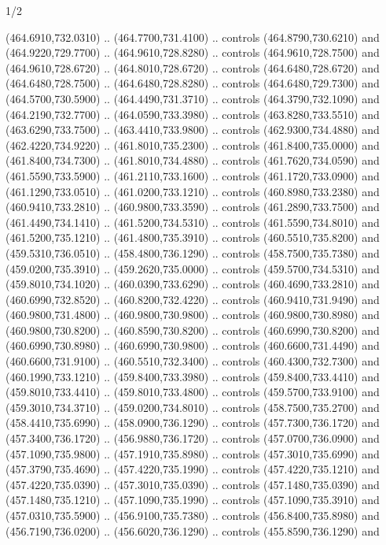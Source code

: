 \begin{flagdescription}{1/2}
\begin{scope}[xshift=0.5\flaglength]
\begin{scope}[scale=0.00745\flagwidth,xshift=-12.1mm,yshift=41.7mm]
\begin{scope}[y=0.80pt, x=0.80pt, yscale=-1, xscale=1, inner sep=0pt, outer sep=0pt]
\begin{scope}[cm={{1.33333,0.0,0.0,-1.33333,(0.0,114.66667)}}]
\begin{scope}[scale=0.100]
  (464.6910,732.0310) .. (464.7700,731.4100) .. controls (464.8790,730.6210) and
  (464.9220,729.7700) .. (464.9610,728.8280) .. controls (464.9610,728.7500) and
  (464.9610,728.6720) .. (464.8010,728.6720) .. controls (464.6480,728.6720) and
  (464.6480,728.7500) .. (464.6480,728.8280) .. controls (464.6480,729.7300) and
  (464.5700,730.5900) .. (464.4490,731.3710) .. controls (464.3790,732.1090) and
  (464.2190,732.7700) .. (464.0590,733.3980) .. controls (463.8280,733.5510) and
  (463.6290,733.7500) .. (463.4410,733.9800) .. controls (462.9300,734.4880) and
  (462.4220,734.9220) .. (461.8010,735.2300) .. controls (461.8400,735.0000) and
  (461.8400,734.7300) .. (461.8010,734.4880) .. controls (461.7620,734.0590) and
  (461.5590,733.5900) .. (461.2110,733.1600) .. controls (461.1720,733.0900) and
  (461.1290,733.0510) .. (461.0200,733.1210) .. controls (460.8980,733.2380) and
  (460.9410,733.2810) .. (460.9800,733.3590) .. controls (461.2890,733.7500) and
  (461.4490,734.1410) .. (461.5200,734.5310) .. controls (461.5590,734.8010) and
  (461.5200,735.1210) .. (461.4800,735.3910) .. controls (460.5510,735.8200) and
  (459.5310,736.0510) .. (458.4800,736.1290) .. controls (458.7500,735.7380) and
  (459.0200,735.3910) .. (459.2620,735.0000) .. controls (459.5700,734.5310) and
  (459.8010,734.1020) .. (460.0390,733.6290) .. controls (460.4690,733.2810) and
  (460.6990,732.8520) .. (460.8200,732.4220) .. controls (460.9410,731.9490) and
  (460.9800,731.4800) .. (460.9800,730.9800) .. controls (460.9800,730.8980) and
  (460.9800,730.8200) .. (460.8590,730.8200) .. controls (460.6990,730.8200) and
  (460.6990,730.8980) .. (460.6990,730.9800) .. controls (460.6600,731.4490) and
  (460.6600,731.9100) .. (460.5510,732.3400) .. controls (460.4300,732.7300) and
  (460.1990,733.1210) .. (459.8400,733.3980) .. controls (459.8400,733.4410) and
  (459.8010,733.4410) .. (459.8010,733.4800) .. controls (459.5700,733.9100) and
  (459.3010,734.3710) .. (459.0200,734.8010) .. controls (458.7500,735.2700) and
  (458.4410,735.6990) .. (458.0900,736.1290) .. controls (457.7300,736.1720) and
  (457.3400,736.1720) .. (456.9880,736.1720) .. controls (457.0700,736.0900) and
  (457.1090,735.9800) .. (457.1910,735.8980) .. controls (457.3010,735.6990) and
  (457.3790,735.4690) .. (457.4220,735.1990) .. controls (457.4220,735.1210) and
  (457.4220,735.0390) .. (457.3010,735.0390) .. controls (457.1480,735.0390) and
  (457.1480,735.1210) .. (457.1090,735.1990) .. controls (457.1090,735.3910) and
  (457.0310,735.5900) .. (456.9100,735.7380) .. controls (456.8400,735.8980) and
  (456.7190,736.0200) .. (456.6020,736.1290) .. controls (455.8590,736.1290) and

\end{scope}
\end{scope}
\end{scope}
\end{scope}
\end{scope}
\end{flagdescription}
